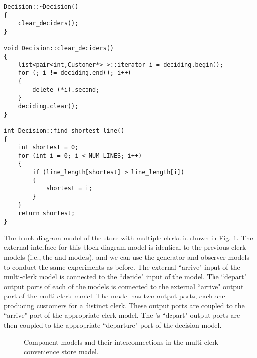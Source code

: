 \begin{verbatim}
Decision::~Decision()
{
    clear_deciders();
}

void Decision::clear_deciders()
{
    list<pair<int,Customer*> >::iterator i = deciding.begin();
    for (; i != deciding.end(); i++)
    {
        delete (*i).second;
    }
    deciding.clear();
}

int Decision::find_shortest_line()
{
    int shortest = 0;
    for (int i = 0; i < NUM_LINES; i++)
    {
        if (line_length[shortest] > line_length[i])
        {
            shortest = i;
        }
    }
    return shortest;
}
\end{verbatim}

The block diagram model of the store with multiple clerks is shown in Fig. \ref{fig:multi_clerk_diagram}. The
external interface for this block diagram model is identical to the
previous clerk models (i.e., the  and  models), and we can
use the generator and observer models to conduct the same experiments
as before. The external ``arrive" input of the
multi-clerk model is connected to the ``decide" input of
the  model.  The ``depart" output ports of each of
the  models is connected to the external ``arrive"
output port of the multi-clerk model.  The  model has two
output ports, each one producing customers for a distinct clerk.  These
output ports are coupled to the ``arrive" port of the
appropriate clerk model.  The 's ``depart" output ports are
then coupled to the appropriate ``departure" port of the
decision model.
\begin{figure}[ht]
\centering
{}
\caption{Component models and their interconnections in the multi-clerk convenience store model.}
\label{fig:multi_clerk_diagram}
\end{figure}    

